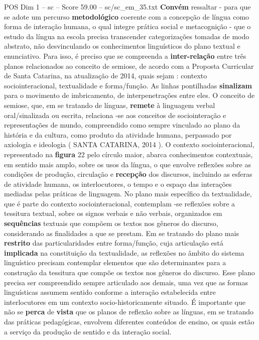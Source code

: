 \begin{textsample}{POS Dim 1 – sc – Score 59.00 – sc/sc\_em\_35.txt}  \label{ex:f1_pos_017}
\textbf{Convém} ressaltar - para que se adote um percurso \textbf{metodológico} coerente com a concepção de língua como forma de interação humana, o qual integre prática social e metacognição - que o estudo da língua na escola precisa transcender categorizações tomadas de modo abstrato, não desvinculando os conhecimentos linguísticos do plano textual e enunciativo.
Para isso, é preciso que se compreenda a \textbf{inter-relação} entre três planos relacionados ao conceito de semiose, de acordo com a Proposta Curricular de Santa Catarina, na atualização de 2014, quais sejam : contexto sociointeracional, textualidade e forma/função.
As linhas pontilhadas \textbf{sinalizam} para o movimento de imbricamento, de interpenetrações entre eles.
O conceito de semiose, que, em se tratando de línguas, \textbf{remete} à linguagem verbal oral/sinalizada ou escrita, relaciona -se aos conceitos de sociointeração e representações de mundo, compreendido como sempre vinculado ao plano da história e da cultura, como produto da atividade humana, perpassado por axiologia e ideologia ( SANTA CATARINA, 2014 ).
O contexto sociointeracional, representado na \textbf{figura} 22 pelo círculo maior, abarca conhecimentos contextuais, em sentido mais amplo, sobre os usos da língua, o que envolve reflexões sobre as condições de produção, circulação e \textbf{recepção} dos discursos, incluindo as esferas de atividade humana, os interlocutores, o tempo e o espaço das interações mediadas pelas práticas de linguagem.
No plano mais específico da textualidade, que é parte do contexto sociointeracional, contemplam -se reflexões sobre a tessitura textual, sobre os signos verbais e não verbais, organizados em \textbf{sequências} textuais que compõem os textos nos gêneros do discurso, considerando as finalidades a que se prestam.
Em se tratando do plano mais \textbf{restrito} das particularidades entre forma/função, cuja articulação está \textbf{implicada} na constituição da textualidade, as reflexões no âmbito do sistema linguístico precisam contemplar elementos que são determinantes para a construção da tessitura que compõe os textos nos gêneros do discurso.
Esse plano precisa ser compreendido sempre articulado aos demais, uma vez que as formas linguísticas assumem sentido conforme a interação estabelecida entre interlocutores em um contexto socio-historicamente situado.
É importante que não se \textbf{perca} de \textbf{vista} que os planos de reflexão sobre as línguas, em se tratando das práticas pedagógicas, envolvem diferentes conteúdos de ensino, os quais estão a serviço da produção de sentido e da interação social.

\end{textsample}
